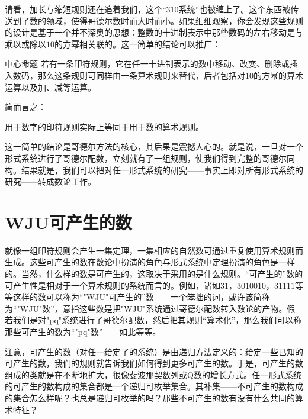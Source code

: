 
请看，加长与缩短规则还在追着我们，这个“$310$系统”也被缠上了。这个东西被传送到了数的领域，使得哥德尔数时而大时而小。如果细细观察，你会发现这些规则的设计是基于一个并不深奥的思想：整数的十进制表示中那些数码的左右移动是与乘以或除以$10$的方幂相关联的。这一简单的结论可以推广：

\begin{thm}{中心命题}
若有一条印符规则，它在任一十进制表示的数中移动、改变、删除或插入数码，那么这条规则可同样由一条算术规则来替代，后者包括对$10$的方幂的算术运算以及加、减等运算。
\end{thm}
简而言之：

\begin{block}
用于数字的印符规则实际上等同于用于数的算术规则。
\end{block}

这一简单的结论是哥德尔方法的核心，其后果是震撼人心的。就是说，一旦对一个形式系统进行了哥德尔配数，立刻就有了一组规则，使我们得到完整的哥德尔同构。结果就是，我们可以把对任一形式系统的研究——事实上即对所有形式系统的研究——转成数论工作。

\section{WJU可产生的数}

就像一组印符规则会产生一集定理，一集相应的自然数可通过重复使用算术规则而生成。这些可产生的数在数论中扮演的角色与形式系统中定理扮演的角色是一样的。当然，什么样的数是可产生的，这取决于采用的是什么规则。“可产生的”数的可产生性是相对于一个算术规则的系统而言的。例如，诸如$31$，$3010010$，$31111$等等这样的数可以称为“"WJU"可产生的”数——一个笨拙的词，或许该简称为“"WJU"数”，意指这些数是把"WJU"系统通过哥德尔配数转入数论的产物。假若我们是对"pq"系统进行了哥德尔配数，然后把其规则“算术化”，那么我们可以称那些可产生的数为“"pq"数”——如此等等。

注意，可产生的数（对任一给定了的系统）是由递归方法定义的：给定一些已知的可产生的数，我们的规则就告诉我们如何得到更多可产生的数。于是，可产生的数组成的类就是在不断地扩大，很像斐波那契数列或Q数的增长方式。任一形式系统的可产生的数构成的集合都是一个递归可枚举集合。其补集——不可产生的数构成的集合怎么样呢？也总是递归可枚举的吗？那些不可产生的数有没有什么共同的算术特征？

